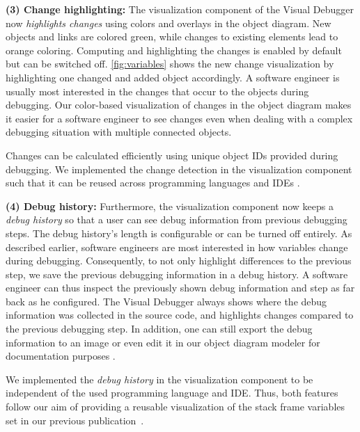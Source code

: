 \documentclass[sigconf]{acmart}
\begin{document}
\textbf{(3) Change highlighting:} The visualization component of the Visual Debugger now \textit{highlights changes} using colors and overlays in the object diagram.
New objects and links are colored green, while changes to existing elements lead to orange coloring.
Computing and highlighting the changes is enabled by default but can be switched off.
\autoref{fig:variables} shows the new change visualization by highlighting one changed and added object accordingly.
A software engineer is usually most interested in the changes that occur to the objects during debugging.
Our color-based visualization of changes in the object diagram makes it easier for a software engineer to see changes even when dealing with a complex debugging situation with multiple connected objects.

Changes can be calculated efficiently using unique object IDs provided during debugging.
We implemented the change detection in the visualization component such that it can be reused across programming languages and IDEs \cite{timkrauterICSE2024Artifacts2023}.

\textbf{(4) Debug history:} Furthermore, the visualization component now keeps a \textit{debug history} so that a user can see debug information from previous debugging steps.
The debug history's length is configurable or can be turned off entirely.
As described earlier, software engineers are most interested in how variables change during debugging.
Consequently, to not only highlight differences to the previous step, we save the previous debugging information in a debug history.
A software engineer can thus inspect the previously shown debug information and step as far back as he configured.
The Visual Debugger always shows where the debug information was collected in the source code, and highlights changes compared to the previous debugging step.
In addition, one can still export the debug information to an image or even edit it in our object diagram modeler \cite{timkrauterObjectdiagramjs2023} for documentation purposes \cite{krauterVisualDebuggerTool2022}.

We implemented the \textit{debug history} in the visualization component to be independent of the used programming language and IDE.
Thus, both features follow our aim of providing a reusable visualization of the stack frame variables set in our previous publication~\cite{krauterVisualDebuggerTool2022}.
\end{document}
